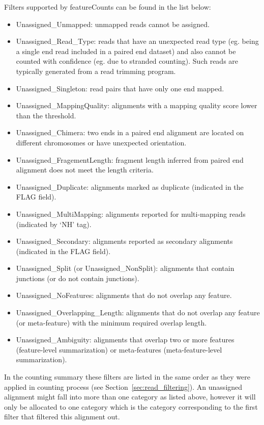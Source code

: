 \documentclass[12pt]{report}
\newcommand{\featureCounts}{\textsf{featureCounts}}
\begin{document}
Filters supported by {\featureCounts} can be found in the list below:

\begin{itemize}
\item Unassigned\_Unmapped: unmapped reads cannot be assigned.
\item Unassigned\_Read\_Type: reads that have an unexpected read type (eg. being a single end read included in a paired end dataset) and also cannot be counted with confidence (eg. due to stranded counting). Such reads are typically generated from a read trimming program.
\item Unassigned\_Singleton: read pairs that have only one end mapped. 
\item Unassigned\_MappingQuality: alignments with a mapping quality score lower than the threshold.
\item Unassigned\_Chimera: two ends in a paired end alignment are located on different chromosomes or have unexpected orientation.
\item Unassigned\_FragementLength: fragment length inferred from paired end alignment does not meet the length criteria.
\item Unassigned\_Duplicate: alignments marked as duplicate (indicated in the FLAG field).
\item Unassigned\_MultiMapping: alignments reported for multi-mapping reads (indicated by `NH' tag).
\item Unassigned\_Secondary: alignments reported as secondary alignments (indicated in the FLAG field). 	
\item Unassigned\_Split (or Unassigned\_NonSplit): alignments that contain junctions (or do not contain junctions).
\item Unassigned\_NoFeatures: alignments that do not overlap any feature.
\item Unassigned\_Overlapping\_Length: alignments that do not overlap any feature (or meta-feature) with the minimum required overlap length.
\item Unassigned\_Ambiguity: alignments that overlap two or more features (feature-level summarization) or meta-features (meta-feature-level summarization).
\end{itemize}

In the counting summary these filters are listed in the same order as they were applied in counting process (see Section~\ref{sec:read_filtering}).
An unassigned alignment might fall into more than one category as listed above, however it will only be allocated to one category which is the category corresponding to the first filter that filtered this alignment out. 
\end{document}
